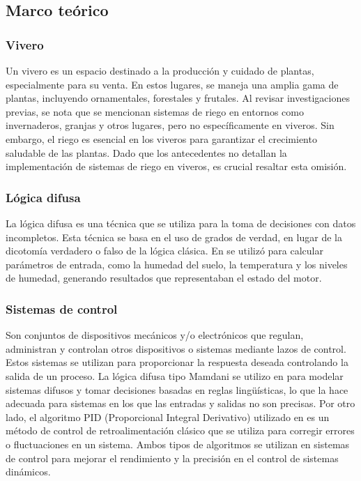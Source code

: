 \subsection{Marco teórico}
\subsubsection*{Vivero}
Un vivero es un espacio destinado a la producción y cuidado de plantas, especialmente para su venta. En estos lugares, se maneja una amplia gama de plantas, incluyendo ornamentales, forestales y frutales. Al revisar investigaciones previas, se nota que se mencionan sistemas de riego en entornos como invernaderos, granjas y otros lugares, pero no específicamente en viveros. Sin embargo, el riego es esencial en los viveros para garantizar el crecimiento saludable de las plantas. Dado que los antecedentes no detallan la implementación de sistemas de riego en viveros, es crucial resaltar esta omisión.

\subsubsection*{Lógica difusa}
La lógica difusa es una técnica que se utiliza para la toma de decisiones con datos incompletos. Esta técnica se basa en el uso de grados de verdad, en lugar de la dicotomía verdadero o falso de la lógica clásica. En \cite{krishnan_fuzzy_2020} se utilizó para calcular parámetros de entrada, como la humedad del suelo, la temperatura y los niveles de humedad, generando resultados que representaban el estado del motor.

\subsubsection*{Sistemas de control}
Son conjuntos de dispositivos mecánicos y/o electrónicos que regulan, administran y controlan otros dispositivos o sistemas mediante lazos de control. Estos sistemas se utilizan para proporcionar la respuesta deseada controlando la salida de un proceso. La lógica difusa tipo Mamdani se utilizo en \cite{mohammed_intelligent_nodate} \cite{widyawati_fuzzy_2022} para modelar sistemas difusos y tomar decisiones basadas en reglas lingüísticas, lo que la hace adecuada para sistemas en los que las entradas y salidas no son precisas. Por otro lado, el algoritmo PID (Proporcional Integral Derivativo) utilizado en \cite{haiyan_intelligent_2022} es un método de control de retroalimentación clásico que se utiliza para corregir errores o fluctuaciones en un sistema. Ambos tipos de algoritmos se utilizan en sistemas de control para mejorar el rendimiento y la precisión en el control de sistemas dinámicos.

